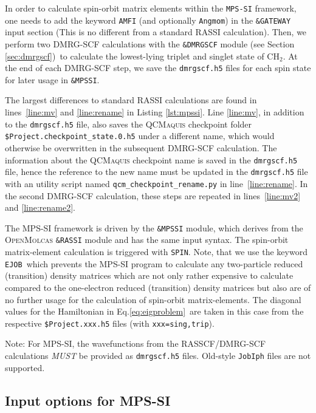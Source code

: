 \documentclass[bibliography=totoc,12pt,a4paper]{scrartcl}
\newcommand{\mol}{\textsc{OpenMolcas}}
\newcommand{\qcm}{\textsc{QCMaquis}}
\newcommand{\kwd}[1]{\texttt{#1}}
\begin{document}
In order to calculate spin-orbit matrix elements within the \kwd{MPS-SI} framework, one needs to add the keyword \texttt{AMFI} (and optionally \texttt{Angmom}) in the \kwd{\&GATEWAY} input section (This is no different from a standard RASSI calculation). Then, we perform two DMRG-SCF calculations with the \kwd{\&DMRGSCF} module (see Section \ref{sec:dmrgscf})\ to calculate the lowest-lying triplet and singlet state of CH$_2$.
At the end of each DMRG-SCF step, we save the \texttt{dmrgscf.h5} files for each spin state for later usage in \kwd{\&MPSSI}.

The largest differences to standard RASSI calculations are found in lines~\ref{line:mv} and \ref{line:rename} in Listing \ref{lst:mpssi}. Line \ref{line:mv}, in addition to the \kwd{dmrgscf.h5} file, also saves the \qcm{} checkpoint folder \texttt{\$Project.checkpoint\_state.0.h5} under a different name, which would otherwise be overwritten in the subsequent DMRG-SCF calculation. The information about the \qcm{} checkpoint name is saved in the \texttt{dmrgscf.h5} file, hence the reference to the new name must be updated in the \kwd{dmrgscf.h5} file with an utility script named \kwd{qcm\_checkpoint\_rename.py} in line~\ref{line:rename}. In the second DMRG-SCF calculation, these steps are repeated in lines~\ref{line:mv2} and \ref{line:rename2}.


The MPS-SI framework is driven by the \kwd{\&MPSSI} module, which derives from the \mol{} \kwd{\&RASSI} module and has the same input syntax. The spin-orbit matrix-element calculation is triggered with \texttt{SPIN}. Note, that we use the keyword \texttt{EJOB}\ which prevents the MPS-SI program to calculate any two-particle reduced (transition) density matrices which are not only rather expensive to calculate compared to the one-electron reduced (transition) density matrices but also are of no further usage for the calculation of spin-orbit matrix-elements. The diagonal values for the Hamiltonian in Eq.\eqref{eq:eigproblem}\ are taken in this case from the respective \texttt{\$Project.xxx.h5} files (with \texttt{xxx=sing,trip}).
\begin{framed}
 \noindent Note: For MPS-SI, the wavefunctions from the RASSCF/DMRG-SCF calculations \emph{MUST} be provided as \texttt{dmrgscf.h5} files. Old-style \texttt{JobIph} files are not supported.
\end{framed}

\subsection{Input options for MPS-SI}\label{sec:input-mpssi}
\end{document}
